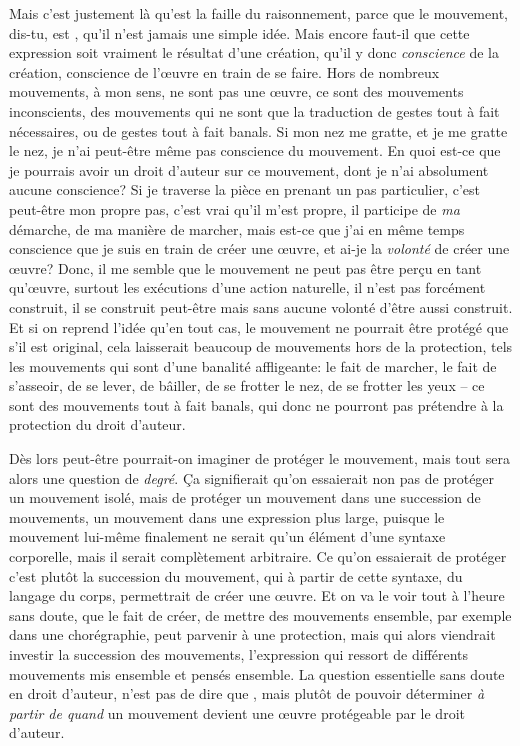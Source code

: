 {Mais c'est justement l\`a qu'est la faille du raisonnement, parce
que le mouvement, dis{}-tu, est , qu'il n'est jamais
une simple id\'ee. Mais encore faut{}-il que cette expression soit
vraiment le r\'esultat d'une cr\'eation, qu'il y donc
{\em conscience} de la cr\'eation, conscience de l'{\oe}uvre en
train de se faire. Hors de nombreux mouvements, \`a mon sens, ne sont
pas une {\oe}uvre, ce sont des mouvements inconscients, des mouvements
qui ne sont que la traduction de gestes tout \`a fait n\'ecessaires, ou
de gestes tout \`a fait banals. Si mon nez me gratte, et je me gratte
le nez, je n'ai peut{}-\^etre m\^eme pas conscience du mouvement. En
quoi est{}-ce que je pourrais avoir un droit d'auteur sur ce mouvement,
dont je n'ai absolument aucune conscience? Si je traverse la pi\`ece en
prenant un pas particulier, c'est peut{}-\^etre mon propre pas, c'est
vrai qu'il m'est propre, il participe de {\em ma} d\'emarche, de ma
mani\`ere de marcher, mais est{}-ce que j'ai en m\^eme temps conscience
que je suis en train de cr\'eer une {\oe}uvre, et ai{}-je la
{\em volont\'e} de cr\'eer une {\oe}uvre? Donc, il me semble que le
mouvement ne peut pas \^etre per\c{c}u en tant qu'{\oe}uvre, surtout
les ex\'ecutions d'une action naturelle, il n'est pas forc\'ement
construit, il se construit peut{}-\^etre mais sans aucune volont\'e
d'\^etre aussi construit. Et si on reprend l'id\'ee qu'en tout cas, le
mouvement ne pourrait \^etre prot\'eg\'e que s'il est original, cela
laisserait beaucoup de mouvements hors de la protection, tels les
mouvements qui sont d'une banalit\'e affligeante: le fait de marcher,
le fait de s'asseoir, de se lever, de b\^ailler, de se frotter le nez,
de se frotter les yeux {--} ce sont des mouvements tout \`a fait
banals, qui donc ne pourront pas pr\'etendre \`a la protection du droit
d'auteur.\par

D\`es lors peut{}-\^etre pourrait{}-on imaginer de prot\'eger le
mouvement, mais tout sera alors une question de {\em degr\'e}.
\c{C}a signifierait qu'on essaierait non pas de prot\'eger un mouvement
isol\'e, mais de prot\'eger un mouvement dans une succession de
mouvements, un mouvement dans une expression plus large, puisque le
mouvement lui{}-m\^eme finalement ne serait qu'un \'el\'ement d'une
syntaxe corporelle, mais il serait compl\`etement arbitraire. Ce qu'on
essaierait de prot\'eger c'est plut\^ot la succession du mouvement, qui
\`a partir de cette syntaxe, du langage du corps, permettrait de
cr\'eer une {\oe}uvre. Et on va le voir tout \`a
l'heure sans doute, que le fait de cr\'eer, de mettre des mouvements
ensemble, par exemple dans une chor\'egraphie, peut parvenir \`a une
protection, mais qui alors viendrait investir la succession des
mouvements, l'expression qui ressort de diff\'erents mouvements mis
ensemble et pens\'es ensemble. La question essentielle sans doute en
droit d'auteur, n'est pas de dire que , mais plut\^ot de pouvoir d\'eterminer {\em \`a
partir de quand} un mouvement devient une {\oe}uvre prot\'egeable par
le droit d'auteur.\par

}

